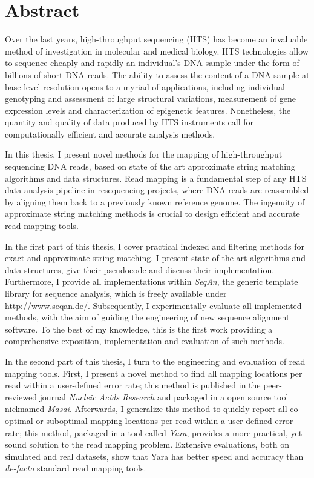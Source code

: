 \section*{Abstract}
\label{sec:abstract:en}

Over the last years, high-throughput sequencing (HTS) has become an invaluable method of investigation in molecular  and medical biology.
HTS technologies allow to sequence cheaply and rapidly an individual's DNA sample under the form of billions of short DNA reads.
The ability to assess the content of a DNA sample at base-level resolution opens to a myriad of applications, including individual genotyping and assessment of large structural variations, measurement of gene expression levels and characterization of epigenetic features.
Nonetheless, the quantity and quality of data produced by HTS instruments call for computationally efficient and accurate analysis methods.

In this thesis, I present novel methods for the mapping of high-throughput sequencing DNA reads, based on state of the art approximate string matching algorithms and data structures.
Read mapping is a fundamental step of any HTS data analysis pipeline in resequencing projects, where DNA reads are reassembled by aligning them back to a previously known reference genome.
The ingenuity of approximate string matching methods is crucial to design efficient and accurate read mapping tools.

In the first part of this thesis, I cover practical indexed and filtering methods for exact and approximate string matching.
I present state of the art algorithms and data structures, give their pseudocode and discuss their implementation.
Furthermore, I provide all implementations within \emph{SeqAn}, the generic \CC template library for sequence analysis, which is freely available under \url{http://www.seqan.de/}.
Subsequently, I experimentally evaluate all implemented methods, with the aim of guiding the engineering of new sequence alignment software.
To the best of my knowledge, this is the first work providing a comprehensive exposition, implementation and evaluation of such methods.

In the second part of this thesis, I turn to the engineering and evaluation of read mapping tools.
First, I present a novel method to find all mapping locations per read within a user-defined error rate;
this method is published in the peer-reviewed journal \emph{Nucleic Acids Research} and packaged in a open source tool nicknamed \emph{Masai}.
Afterwards, I generalize this method to quickly report all co-optimal or suboptimal mapping locations per read within a user-defined error rate;
this method, packaged in a tool called \emph{Yara}, provides a more practical, yet sound solution to the read mapping problem.
Extensive evaluations, both on simulated and real datasets, show that Yara has better speed and accuracy than \emph{de-facto} standard read mapping tools.

\newpage
